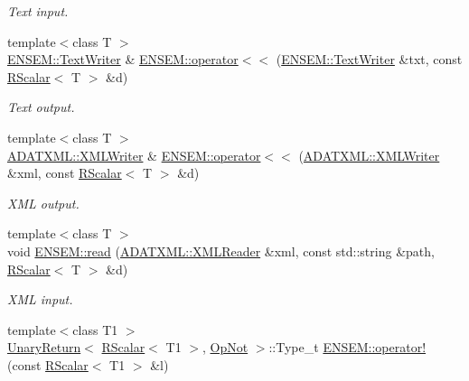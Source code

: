 \begin{DoxyCompactItemize}
\begin{DoxyCompactList}\small\item\em Text input. \end{DoxyCompactList}\item 
{\footnotesize template$<$class T $>$ }\\\mbox{\hyperlink{classENSEM_1_1TextWriter}{E\+N\+S\+E\+M\+::\+Text\+Writer}} \& \mbox{\hyperlink{group__rscalar_ga1b0ef216d273bb97e82fce8f99467105}{E\+N\+S\+E\+M\+::operator$<$$<$}} (\mbox{\hyperlink{classENSEM_1_1TextWriter}{E\+N\+S\+E\+M\+::\+Text\+Writer}} \&txt, const \mbox{\hyperlink{classENSEM_1_1RScalar}{R\+Scalar}}$<$ T $>$ \&d)
\begin{DoxyCompactList}\small\item\em Text output. \end{DoxyCompactList}\item 
{\footnotesize template$<$class T $>$ }\\\mbox{\hyperlink{classADATXML_1_1XMLWriter}{A\+D\+A\+T\+X\+M\+L\+::\+X\+M\+L\+Writer}} \& \mbox{\hyperlink{group__rscalar_ga73069f4953b3397b5fbd94f9b78203fa}{E\+N\+S\+E\+M\+::operator$<$$<$}} (\mbox{\hyperlink{classADATXML_1_1XMLWriter}{A\+D\+A\+T\+X\+M\+L\+::\+X\+M\+L\+Writer}} \&xml, const \mbox{\hyperlink{classENSEM_1_1RScalar}{R\+Scalar}}$<$ T $>$ \&d)
\begin{DoxyCompactList}\small\item\em X\+ML output. \end{DoxyCompactList}\item 
{\footnotesize template$<$class T $>$ }\\void \mbox{\hyperlink{group__rscalar_ga254ddc2517282f105035865bc1e227dc}{E\+N\+S\+E\+M\+::read}} (\mbox{\hyperlink{classADATXML_1_1XMLReader}{A\+D\+A\+T\+X\+M\+L\+::\+X\+M\+L\+Reader}} \&xml, const std\+::string \&path, \mbox{\hyperlink{classENSEM_1_1RScalar}{R\+Scalar}}$<$ T $>$ \&d)
\begin{DoxyCompactList}\small\item\em X\+ML input. \end{DoxyCompactList}\item 
{\footnotesize template$<$class T1 $>$ }\\\mbox{\hyperlink{structENSEM_1_1UnaryReturn}{Unary\+Return}}$<$ \mbox{\hyperlink{classENSEM_1_1RScalar}{R\+Scalar}}$<$ T1 $>$, \mbox{\hyperlink{structENSEM_1_1OpNot}{Op\+Not}} $>$\+::Type\+\_\+t \mbox{\hyperlink{group__rscalar_gaf7f4b83a6f16cb689121bc04a4c6f0e2}{E\+N\+S\+E\+M\+::operator!}} (const \mbox{\hyperlink{classENSEM_1_1RScalar}{R\+Scalar}}$<$ T1 $>$ \&l)

\end{DoxyCompactItemize}
